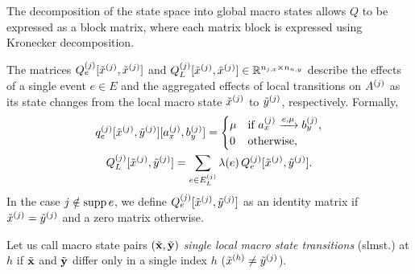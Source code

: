 The decomposition of the state space into global macro states allows
$Q$ to be expressed as a block matrix, where each matrix block is
expressed using Kronecker decomposition.

The matrices $Q_e^{(j)}[\tilde{x}^{(j)}, \tilde{x}^{(j)}]$
and $Q_L^{(j)}[\tilde{x}^{(j)}, \tilde{x}^{(j)}] \in
\mathbb{R}^{n_{j,x} \times n_{n, y}}$ describe
the effects of a single event $e \in E$ and the aggregated effects of
local transitions on $A^{(j)}$ as its state changes from the local
macro state $\tilde{x}^{(j)}$ to $\tilde{y}^{(j)}$,
respectively. Formally,
\begin{gather}
  q_e^{(j)}[\tilde{x}^{(j)},
  \tilde{y}^{(j)}][a_x^{(j)}, b_y^{(j)}] = \begin{cases}
    \mu & \text{if $a_x^{(j)} \xrightarrow{e, \mu} b_y^{(j)}$,} \\
    0 & \text{otherwise,}
  \end{cases} \label{eq:genstor:explicit:block:tran-matrix}\\
  Q_L^{(j)}[\tilde{x}^{(j)}, \tilde{y}^{(j)}] = \sum_{e \in
    E_L^{(j)}} \lambda(e) \, Q_e^{(j)}[\tilde{x}^{(j)},
  \tilde{y}^{(j)}] \label{eq:genstor:explicit:block:local-matrix} \text.
\end{gather}
In the case $j \notin \operatorname{supp} e$, we define $Q_e^{(j)}[\tilde{x}^{(j)},
\tilde{y}^{(j)}]$ as an identity matrix if $\tilde{x}^{(j)} =
\tilde{y}^{(j)}$ and a zero matrix otherwise.

Let us call macro state pairs $(\tilde{\bm{\mathrm{x}}}, \tilde{\bm{\mathrm{y}}})$
\emph{single local macro state transitions} (slmst.) at $h$ if $\tilde{\bm{\mathrm{x}}}$
and $\tilde{\bm{\mathrm{y}}}$ differ only in a single index $h$
($\tilde{x}^{(h)} \ne \tilde{y}^{(j)}$).

